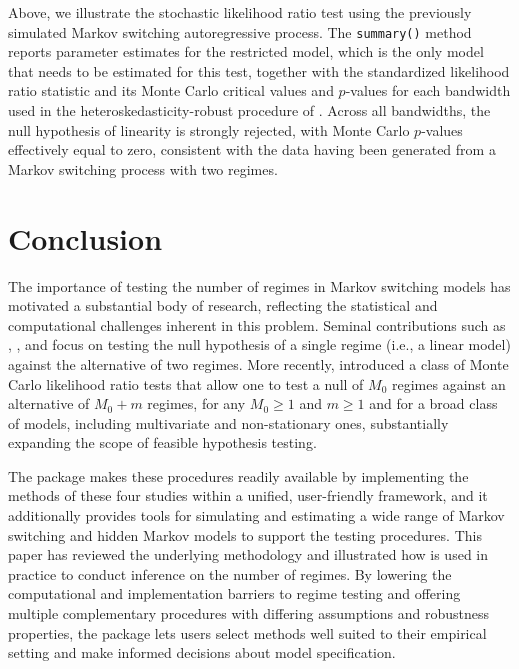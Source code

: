 Above, we illustrate the stochastic likelihood ratio test using the previously simulated Markov switching autoregressive process. The \texttt{summary()} method reports parameter estimates for the restricted model, which is the only model that needs to be estimated for this test, together with the standardized likelihood ratio statistic and its Monte Carlo critical values and \(p\)-values for each bandwidth used in the heteroskedasticity-robust procedure of \citet{hansen96}. Across all bandwidths, the null hypothesis of linearity is strongly rejected, with Monte Carlo \(p\)-values effectively equal to zero, consistent with the data having been generated from a Markov switching process with two regimes.

\section{Conclusion}\label{conclusion}

The importance of testing the number of regimes in Markov switching models has motivated a substantial body of research, reflecting the statistical and computational challenges inherent in this problem. Seminal contributions such as \citet{hansen92}, \citet{chp14}, and \citet{dufourluger17} focus on testing the null hypothesis of a single regime (i.e., a linear model) against the alternative of two regimes. More recently, \citet{rodrondufour_mcmstest} introduced a class of Monte Carlo likelihood ratio tests that allow one to test a null of \(M_0\) regimes against an alternative of \(M_0 + m\) regimes, for any \(M_0 \geq 1\) and \(m \geq 1\) and for a broad class of models, including multivariate and non-stationary ones, substantially expanding the scope of feasible hypothesis testing.

The  package makes these procedures readily available by implementing the methods of these four studies within a unified, user-friendly framework, and it additionally provides tools for simulating and estimating a wide range of Markov switching and hidden Markov models to support the testing procedures. This paper has reviewed the underlying methodology and illustrated how  is used in practice to conduct inference on the number of regimes. By lowering the computational and implementation barriers to regime testing and offering multiple complementary procedures with differing assumptions and robustness properties, the package lets users select methods well suited to their empirical setting and make informed decisions about model specification.

